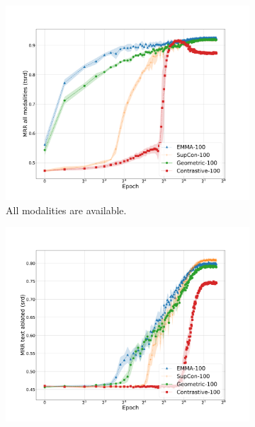 \documentclass[sigconf,natbib=true,anonymous=true]{acmart}
\begin{document}
\begin{figure}
    \centering
    \begin{subfigure}[b]{0.49\columnwidth}
        \centering
        \includegraphics[width=\columnwidth]{Figures/average-seeds-epochs-mrr_lard-trimmed.pdf}
        \caption[]{All modalities are available.}    
        \label{fig:epochs-mrr.lard}
    \end{subfigure}
    \hfill
    \begin{subfigure}[b]{0.49\columnwidth}  
        \centering 
        \includegraphics[width=\columnwidth]{Figures/average-seeds-epochs-mrr_ard-trimmed.pdf}

\end{subfigure}
\end{figure}
\end{document}
